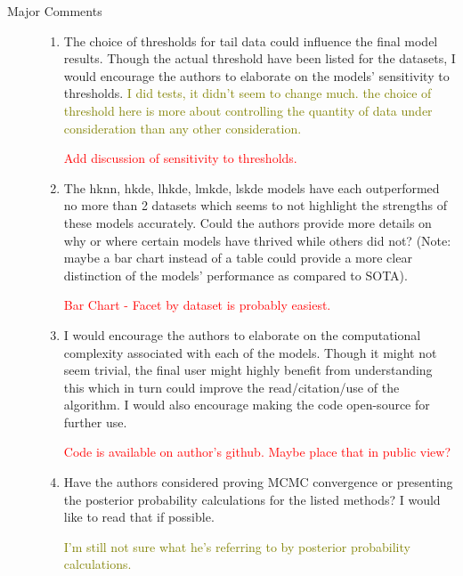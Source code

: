 \documentclass{article}
\newcommand{\comment}[1]{\textcolor{olive}{#1}}
\newcommand{\makenote}[1]{\textcolor{red}{#1}}
\begin{document}
\begin{description}
    \item[Major Comments]
    \begin{enumerate}
        \item The choice of thresholds for tail data could influence the final model results. 
            Though the actual threshold have been listed for the datasets, I would encourage 
            the authors to elaborate on the models' sensitivity to thresholds.
            \comment{I did tests, it didn't seem to change much.  the choice of threshold here 
                is more about controlling the quantity of data under consideration than any other 
                consideration.}

            \makenote{Add discussion of sensitivity to thresholds.}
            
        \item The hknn, hkde, lhkde, lmkde, lskde models have each outperformed no more than 
            2 datasets which seems to not highlight the strengths of these models accurately. 
            Could the authors provide more details on why or where certain models have thrived 
            while others did not? (Note: maybe a bar chart instead of a table could provide a 
            more clear distinction of the models' performance as compared to SOTA).
            
            \makenote{Bar Chart - Facet by dataset is probably easiest.}


        \item I would encourage the authors to elaborate on the computational complexity 
            associated with each of the models. Though it might not seem trivial, the final 
            user might highly benefit from understanding this which in turn could improve the 
            read/citation/use of the algorithm. I would also encourage making the code 
            open-source for further use.

            \makenote{Code is available on author's github.  Maybe place that in public view?}

        \item Have the authors considered proving MCMC convergence or presenting the posterior 
            probability calculations for the listed methods? I would like to read that if possible.
            
            \comment{I'm still not sure what he's referring to by posterior probability calculations.}


\end{enumerate}
\end{description}
\end{document}
